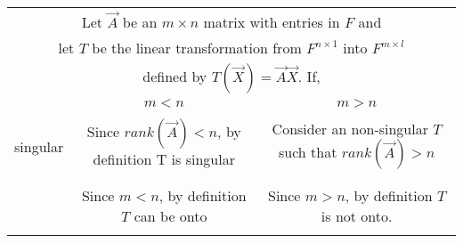 \begin{table*}[!hb]
	\begin{center}
\resizebox{2\columnwidth}{!}
{
		\begin{tabular}{|c|c|c|}			
			\hline
			\multicolumn{3}{|c|}{Let $\vec{A}$ be an $m \times n$ matrix with entries in $F$ and}\\
			\multicolumn{3}{|c|}{let $T$ be the linear transformation from $F^{n \times1 }$ into $F^{m \times l}$}\\
			\multicolumn{3}{|c|}{defined by $T(\vec{X}) = \vec{A}\vec{X}$. If,}\\			
			\hline
			& \multicolumn{1}{|c|}{$m < n$} & \multicolumn{1}{c|}{$m > n$}\\
			\hline
			\multirow{4}{*}{singular} & &\\
			& Since $rank(\vec{A})<n$, by definition T is singular & Consider an non-singular $T$ such that $rank(\vec{A}) > n$\\
			&  & \\
			\hline
			\multirow{3}{*}{onto} & &\\
			& Since $m<n$, by definition $T$ can be onto & Since $m>n$, by definition $T$ is not onto.\\
			& &\\
			\hline
			\end{tabular}
}
	\end{center}
\caption{}
\label{table:solutions/3/2/10/2}
\end{table*}
